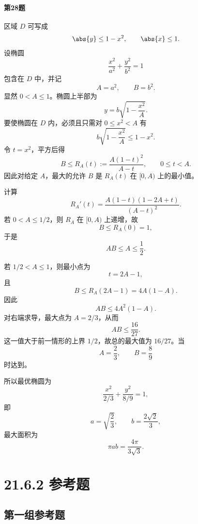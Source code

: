 \paragraph{第28题}
\begin{xsolution}
区域 $D$ 可写成
\[
  \abs{y}\le1-x^2,
  \qquad
  \abs{x}\le1.
\]
设椭圆
\[
  \frac{x^2}{a^2}+\frac{y^2}{b^2}=1
\]
包含在 $D$ 中，并记
\[
  A=a^2,
  \qquad
  B=b^2.
\]
显然 $0<A\le1$。椭圆上半部为
\[
  y=b\sqrt{1-\frac{x^2}{A}}.
\]
要使椭圆在 $D$ 内，必须且只需对 $0\le x^2<A$ 有
\[
  b\sqrt{1-\frac{x^2}{A}}\le1-x^2.
\]
令 $t=x^2$，平方后得
\[
  B\le R_A(t):=\frac{A(1-t)^2}{A-t},
  \qquad 0\le t<A.
\]
因此对给定 $A$，最大的允许 $B$ 是 $R_A(t)$ 在 $[0,A)$ 上的最小值。

计算
\[
  R_A'(t)
  =\frac{A(1-t)(1-2A+t)}{(A-t)^2}.
\]
若 $0<A\le1/2$，则 $R_A$ 在 $[0,A)$ 上递增，故
\[
  B\le R_A(0)=1,
\]
于是
\[
  AB\le A\le\frac12.
\]

若 $1/2<A\le1$，则最小点为
\[
  t=2A-1,
\]
且
\[
  B\le R_A(2A-1)=4A(1-A).
\]
因此
\[
  AB\le4A^2(1-A).
\]
对右端求导，最大点为 $A=2/3$，从而
\[
  AB\le\frac{16}{27}.
\]
这一值大于前一情形的上界 $1/2$，故总的最大值为 $16/27$。当
\[
  A=\frac23,
  \qquad
  B=\frac89
\]
时达到。

所以最优椭圆为
\[
  \frac{x^2}{2/3}+\frac{y^2}{8/9}=1,
\]
即
\[
  a=\sqrt{\frac23},
  \qquad
  b=\frac{2\sqrt2}{3},
\]
最大面积为
\[
  \pi ab
  =\frac{4\pi}{3\sqrt3}.
\]
\end{xsolution}
\section*{21.6.2 参考题}
\subsection*{第一组参考题}

